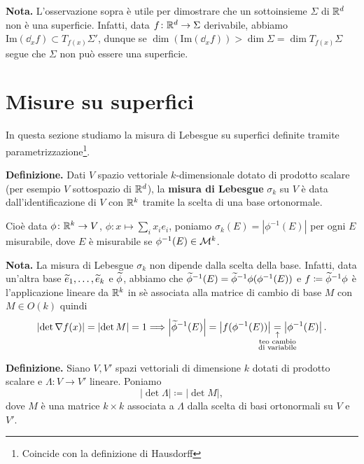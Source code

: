 \textbf{Nota.} L'osservazione sopra è utile per dimostrare che un sottoinsieme $\Sigma$ di $\mathbb R^d$ non è una superficie. Infatti, data $f \colon \mathbb R^d \to \Sigma$ derivabile, abbiamo $\text{Im}(\dd_x f) \subset T_{f(x)} \Sigma'$, dunque se $\dim(\text{Im}(\dd_x f)) > \dim \Sigma = \dim T_{f(x)} \Sigma$ segue che $\Sigma$ non può essere una superficie.

\newpage

\section{Misure su superfici}

In questa sezione studiamo la misura di Lebesgue su superfici definite tramite parametrizzazione\footnote{Coincide con la definizione di Hausdorff}.

\textbf{Definizione.} Dati $V$ spazio vettoriale $k$-dimensionale dotato di prodotto scalare (per esempio $V$ sottospazio di $\mathbb R^d$), la \textbf{misura di Lebesgue} $\sigma_k$ su $V$ è data dall'identificazione di $V$ con $\mathbb R^k$ tramite la scelta di una base ortonormale.

Cioè data $\phi \colon \mathbb R^k \to V$, $\phi \colon x \mapsto \sum_i x_i e_i$, poniamo $\sigma_k(E) = \left| \phi^{-1}(E) \right|$ per ogni $E$ misurabile, dove $E$ è misurabile se $\phi^{-1}(E) \in \mathcal{M}^k$.

\textbf{Nota.} La misura di Lebesgue $\sigma_k$ non dipende dalla scelta della base. Infatti, data un'altra base $\widetilde{e}_1,\ldots,\widetilde{e}_k$ e $\widetilde{\phi}$, abbiamo che $\widetilde{\phi}^{-1}(E) = \widetilde{\phi}^{-1}\phi(\phi^{-1}(E))$ e $f \coloneqq \widetilde{\phi}^{-1} \phi$ è l'applicazione lineare da $\mathbb R^k$ in sè associata alla matrice di cambio di base $M$ con $M \in O(k)$ quindi
$$
	\left| \det\nabla f(x) \right| = \left| \det M \right| = 1
	\Longrightarrow 
	\left| \wtilde{\phi}^{-1}(E) \right| 
	= \left| f(\phi^{-1}(E)) \right| \underset{\mathclap{\substack{\uparrow \\ \text{teo cambio} \\ \text{di variabile}}}}{=}
	\left| \phi^{-1}(E) \right|.
$$

\textbf{Definizione.} Siano $V,V'$ spazi vettoriali di dimensione $k$ dotati di prodotto scalare e $\Lambda \colon V \to V'$ lineare. Poniamo
%
$$
	|\det \Lambda| \coloneqq |\det M|,
$$
%
dove $M$ è una matrice $k \times k$ associata a $\Lambda$ dalla scelta di basi ortonormali su $V$ e $V'$.


